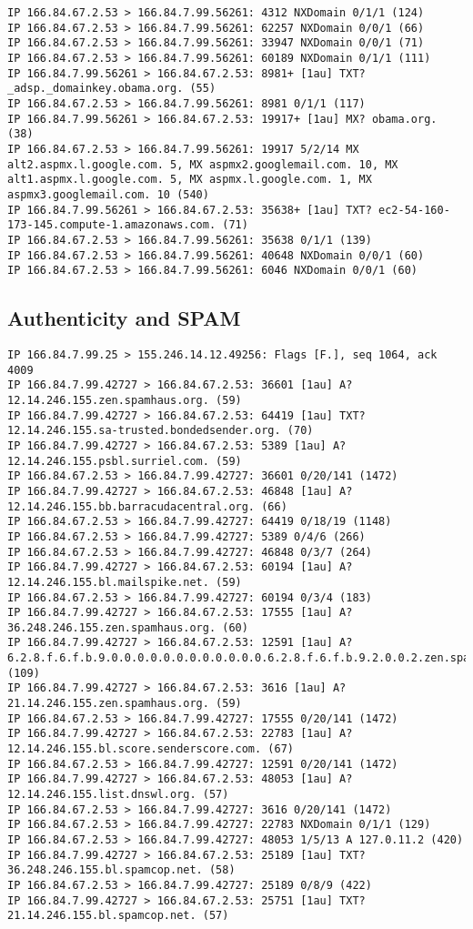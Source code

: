 \documentclass[xga]{xdvislides}
\begin{document}
\begin{verbatim}
IP 166.84.67.2.53 > 166.84.7.99.56261: 4312 NXDomain 0/1/1 (124)
IP 166.84.67.2.53 > 166.84.7.99.56261: 62257 NXDomain 0/0/1 (66)
IP 166.84.67.2.53 > 166.84.7.99.56261: 33947 NXDomain 0/0/1 (71)
IP 166.84.67.2.53 > 166.84.7.99.56261: 60189 NXDomain 0/1/1 (111)
IP 166.84.7.99.56261 > 166.84.67.2.53: 8981+ [1au] TXT? _adsp._domainkey.obama.org. (55)
IP 166.84.67.2.53 > 166.84.7.99.56261: 8981 0/1/1 (117)
IP 166.84.7.99.56261 > 166.84.67.2.53: 19917+ [1au] MX? obama.org. (38)
IP 166.84.67.2.53 > 166.84.7.99.56261: 19917 5/2/14 MX alt2.aspmx.l.google.com. 5, MX aspmx2.googlemail.com. 10, MX alt1.aspmx.l.google.com. 5, MX aspmx.l.google.com. 1, MX aspmx3.googlemail.com. 10 (540)
IP 166.84.7.99.56261 > 166.84.67.2.53: 35638+ [1au] TXT? ec2-54-160-173-145.compute-1.amazonaws.com. (71)
IP 166.84.67.2.53 > 166.84.7.99.56261: 35638 0/1/1 (139)
IP 166.84.67.2.53 > 166.84.7.99.56261: 40648 NXDomain 0/0/1 (60)
IP 166.84.67.2.53 > 166.84.7.99.56261: 6046 NXDomain 0/0/1 (60)
\end{verbatim}
\Normalsize

\subsection{Authenticity and SPAM}
\smallish
\begin{verbatim}
IP 166.84.7.99.25 > 155.246.14.12.49256: Flags [F.], seq 1064, ack 4009
IP 166.84.7.99.42727 > 166.84.67.2.53: 36601 [1au] A? 12.14.246.155.zen.spamhaus.org. (59)
IP 166.84.7.99.42727 > 166.84.67.2.53: 64419 [1au] TXT? 12.14.246.155.sa-trusted.bondedsender.org. (70)
IP 166.84.7.99.42727 > 166.84.67.2.53: 5389 [1au] A? 12.14.246.155.psbl.surriel.com. (59)
IP 166.84.67.2.53 > 166.84.7.99.42727: 36601 0/20/141 (1472)
IP 166.84.7.99.42727 > 166.84.67.2.53: 46848 [1au] A? 12.14.246.155.bb.barracudacentral.org. (66)
IP 166.84.67.2.53 > 166.84.7.99.42727: 64419 0/18/19 (1148)
IP 166.84.67.2.53 > 166.84.7.99.42727: 5389 0/4/6 (266)
IP 166.84.67.2.53 > 166.84.7.99.42727: 46848 0/3/7 (264)
IP 166.84.7.99.42727 > 166.84.67.2.53: 60194 [1au] A? 12.14.246.155.bl.mailspike.net. (59)
IP 166.84.67.2.53 > 166.84.7.99.42727: 60194 0/3/4 (183)
IP 166.84.7.99.42727 > 166.84.67.2.53: 17555 [1au] A? 36.248.246.155.zen.spamhaus.org. (60)
IP 166.84.7.99.42727 > 166.84.67.2.53: 12591 [1au] A? 6.2.8.f.6.f.b.9.0.0.0.0.0.0.0.0.0.0.0.0.6.2.8.f.6.f.b.9.2.0.0.2.zen.spamhaus.org. (109)
IP 166.84.7.99.42727 > 166.84.67.2.53: 3616 [1au] A? 21.14.246.155.zen.spamhaus.org. (59)
IP 166.84.67.2.53 > 166.84.7.99.42727: 17555 0/20/141 (1472)
IP 166.84.7.99.42727 > 166.84.67.2.53: 22783 [1au] A? 12.14.246.155.bl.score.senderscore.com. (67)
IP 166.84.67.2.53 > 166.84.7.99.42727: 12591 0/20/141 (1472)
IP 166.84.7.99.42727 > 166.84.67.2.53: 48053 [1au] A? 12.14.246.155.list.dnswl.org. (57)
IP 166.84.67.2.53 > 166.84.7.99.42727: 3616 0/20/141 (1472)
IP 166.84.67.2.53 > 166.84.7.99.42727: 22783 NXDomain 0/1/1 (129)
IP 166.84.67.2.53 > 166.84.7.99.42727: 48053 1/5/13 A 127.0.11.2 (420)
IP 166.84.7.99.42727 > 166.84.67.2.53: 25189 [1au] TXT? 36.248.246.155.bl.spamcop.net. (58)
IP 166.84.67.2.53 > 166.84.7.99.42727: 25189 0/8/9 (422)
IP 166.84.7.99.42727 > 166.84.67.2.53: 25751 [1au] TXT? 21.14.246.155.bl.spamcop.net. (57)
\end{verbatim}
\Normalsize
\end{document}
